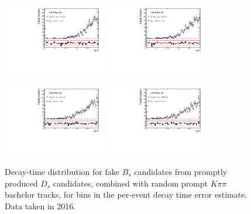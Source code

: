 \begin{figure}[h]
\includegraphics[height=!,width=0.4\textwidth]{figs/Resolution/SignalData_16_bin_7.pdf}
\includegraphics[height=!,width=0.4\textwidth]{figs/Resolution/SignalData_16_bin_8.pdf}

\includegraphics[height=!,width=0.4\textwidth]{figs/Resolution/SignalData_16_bin_9.pdf}
\includegraphics[height=!,width=0.4\textwidth]{figs/Resolution/SignalData_16_bin_10.pdf}
\caption{Decay-time distribution for fake $B_s$ candidates from promptly produced $D_s$ candidates, combined with random prompt $K\pi\pi$ bachelor tracks, for bins in the per-event decay time error estimate. Data taken in 2016.}
\label{fig:}
\end{figure}


